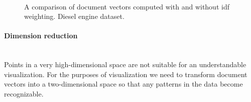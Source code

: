 \begin{figure}[!]
    \centering
    \\
    \caption{A comparison of document vectors computed with and without \gls{idf} weighting. Diesel engine dataset.}
    \label{fig:weighted_vs_average_diesel}
\end{figure}

\paragraph{Dimension reduction}~\\
Points in a very high-dimensional space are not suitable for an understandable visualization.
For the purposes of visualization we need to transform document vectors into a two-dimensional space so that any patterns in the data become recognizable.


